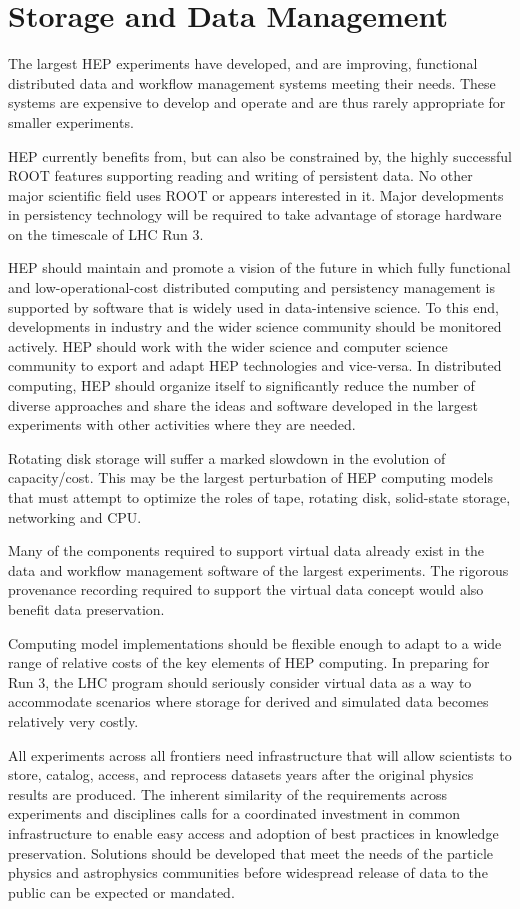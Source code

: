\section{Storage and Data Management}


The largest HEP experiments have developed, and are improving,
functional distributed data and workflow management systems meeting
their needs. These systems are expensive to develop and operate and
are thus  rarely appropriate for smaller experiments.

HEP currently benefits from, but can also be  constrained by, the
highly successful ROOT features supporting reading  and writing of
persistent data. No other major scientific field uses  ROOT or appears
interested in it. Major developments in persistency  technology will
be required to take advantage of storage hardware on the  timescale of
LHC Run 3.

HEP should maintain and promote a vision of the future  in which fully
functional and low-operational-cost distributed computing and
persistency management is supported by software that is widely used in
data-intensive science.  To this end, developments in industry and the
wider  science community should be monitored actively. HEP should work
with the wider  science and computer science community to export and
adapt HEP technologies and  vice-versa. In distributed computing, HEP
should organize itself to significantly  reduce the number of diverse
approaches and share the ideas and  software developed
in the largest experiments with other activities where they are needed.

Rotating disk storage will suffer a marked slowdown in the  evolution
of capacity/cost.  This may be the largest perturbation of HEP
computing  models that must attempt to optimize the roles of tape,
rotating disk, solid-state  storage, networking and CPU.

Many of the components required to support virtual data  already exist
in the data and workflow management software of the largest
experiments.   The rigorous provenance recording required to support
the virtual data concept would  also benefit data preservation.

Computing model implementations should be flexible  enough to adapt to
a wide range of relative costs of the key elements of HEP  computing.
In preparing for Run 3, the LHC program should seriously consider
virtual data as a way to accommodate scenarios where storage for
derived and  simulated data becomes relatively very costly.

All experiments across all frontiers
need  infrastructure that will allow scientists to store, catalog,
access, and  reprocess datasets years after the original physics
results are produced.  The inherent similarity of the requirements
across experiments and disciplines  calls for a coordinated investment
in common infrastructure to enable easy  access and adoption of best
practices in knowledge preservation.  Solutions  should be developed
that meet the needs of the particle physics and astrophysics  communities
before widespread release of data to the public can be expected  or
mandated.

